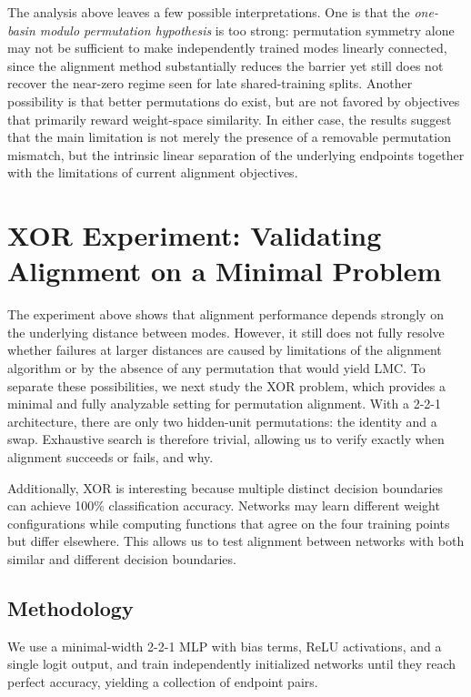 \documentclass[11pt,a4paper]{report}
\begin{document}
The analysis above leaves a few possible interpretations. One is that the \textit{one-basin modulo permutation hypothesis} is too strong: permutation symmetry alone may not be sufficient to make independently trained modes linearly connected, since the alignment method substantially reduces the barrier yet still does not recover the near-zero regime seen for late shared-training splits. Another possibility is that better permutations do exist, but are not favored by objectives that primarily reward weight-space similarity. In either case, the results suggest that the main limitation is not merely the presence of a removable permutation mismatch, but the intrinsic linear separation of the underlying endpoints together with the limitations of current alignment objectives.



\section{XOR Experiment: Validating Alignment on a Minimal Problem}
\label{sec:xor_min}
The experiment above shows that alignment performance depends strongly on the underlying distance between modes. However, it still does not fully resolve whether failures at larger distances are caused by limitations of the alignment algorithm or by the absence of any permutation that would yield LMC. To separate these possibilities, we next study the XOR problem, which provides a minimal and fully analyzable setting for permutation alignment. With a 2-2-1 architecture, there are only two hidden-unit permutations: the identity and a swap. Exhaustive search is therefore trivial, allowing us to verify exactly when alignment succeeds or fails, and why.



Additionally, XOR is interesting because multiple distinct decision boundaries can achieve 100\% classification accuracy. Networks may learn different weight configurations while computing functions that agree on the four training points but differ elsewhere. This allows us to test alignment between networks with both similar and different decision boundaries.

\subsection{Methodology}

We use a minimal-width 2-2-1 MLP with bias terms, ReLU activations, and a single logit output, and train independently initialized networks until they reach perfect accuracy, yielding a collection of endpoint pairs.
\end{document}
